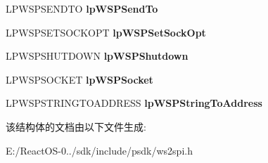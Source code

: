 \begin{DoxyCompactItemize}
\item 
\mbox{\label{struct___w_s_p_p_r_o_c___t_a_b_l_e_a18893a80ddb091429ae671783cb237c2}} 
L\+P\+W\+S\+P\+S\+E\+N\+D\+TO {\bfseries lp\+W\+S\+P\+Send\+To}
\item 
\mbox{\label{struct___w_s_p_p_r_o_c___t_a_b_l_e_a2b5219edd05f4997944c0c91d1e2c4f7}} 
L\+P\+W\+S\+P\+S\+E\+T\+S\+O\+C\+K\+O\+PT {\bfseries lp\+W\+S\+P\+Set\+Sock\+Opt}
\item 
\mbox{\label{struct___w_s_p_p_r_o_c___t_a_b_l_e_a6bf3b52d66361034d3b5fe2090f75a28}} 
L\+P\+W\+S\+P\+S\+H\+U\+T\+D\+O\+WN {\bfseries lp\+W\+S\+P\+Shutdown}
\item 
\mbox{\label{struct___w_s_p_p_r_o_c___t_a_b_l_e_a716eb08ce6ca031c49aa4ff01bac02db}} 
L\+P\+W\+S\+P\+S\+O\+C\+K\+ET {\bfseries lp\+W\+S\+P\+Socket}
\item 
\mbox{\label{struct___w_s_p_p_r_o_c___t_a_b_l_e_a2b516e4aa095ed4d71f321fe781e124d}} 
L\+P\+W\+S\+P\+S\+T\+R\+I\+N\+G\+T\+O\+A\+D\+D\+R\+E\+SS {\bfseries lp\+W\+S\+P\+String\+To\+Address}
\end{DoxyCompactItemize}


该结构体的文档由以下文件生成\+:\begin{DoxyCompactItemize}
\item 
E\+:/\+React\+O\+S-\/0../sdk/include/psdk/ws2spi.\+h\end{DoxyCompactItemize}
